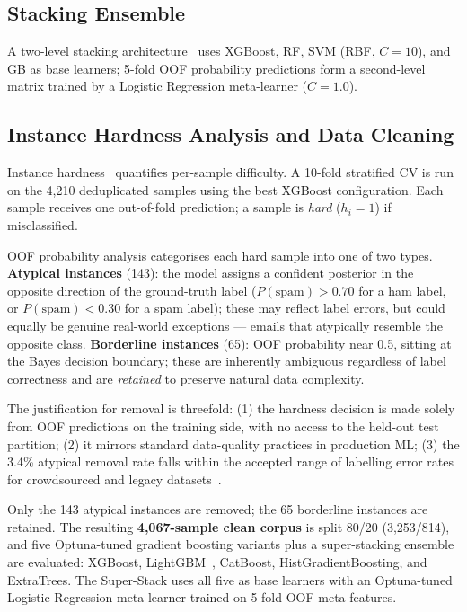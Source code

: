 \documentclass[conference]{IEEEtran}
\begin{document}
\subsection{Stacking Ensemble}

A two-level stacking architecture~\cite{ref12} uses XGBoost,
RF, SVM (RBF, $C=10$), and GB as base learners; 5-fold OOF
probability predictions form a second-level matrix trained by
a Logistic Regression meta-learner ($C=1.0$).

\subsection{Instance Hardness Analysis and Data Cleaning}
\label{sec:hardness}

Instance hardness~\cite{ref15} quantifies per-sample difficulty.
A 10-fold stratified CV is run on the 4,210 deduplicated samples
using the best XGBoost configuration. Each sample receives one out-of-fold
prediction; a sample is \emph{hard} ($h_i=1$) if misclassified.

OOF probability analysis categorises each hard sample into
one of two types. \textbf{Atypical instances} (143): the model
assigns a confident posterior in the opposite direction of the
ground-truth label ($P(\text{spam})>0.70$ for a ham label, or
$P(\text{spam})<0.30$ for a spam label); these may reflect
label errors, but could equally be genuine real-world
exceptions --- emails that atypically resemble the opposite
class. \textbf{Borderline instances} (65): OOF probability
near 0.5, sitting at the Bayes decision boundary; these are
inherently ambiguous regardless of label correctness and are
\emph{retained} to preserve natural data complexity.

The justification for removal is threefold: (1) the hardness
decision is made solely from OOF predictions on the training
side, with no access to the held-out test partition; (2) it
mirrors standard data-quality practices in production ML; (3)
the 3.4\% atypical removal rate falls within the accepted range of
labelling error rates for crowdsourced and legacy datasets~\cite{ref2}.

Only the 143 atypical instances are removed; the 65 borderline
instances are retained. The resulting \textbf{4,067-sample
clean corpus} is split 80/20 (3,253/814), and five
Optuna-tuned gradient boosting variants
plus a super-stacking ensemble are evaluated: XGBoost,
LightGBM~\cite{ref7}, CatBoost, HistGradientBoosting, and
ExtraTrees. The Super-Stack uses all five as base learners with
an Optuna-tuned Logistic Regression meta-learner trained on
5-fold OOF meta-features.
\end{document}
